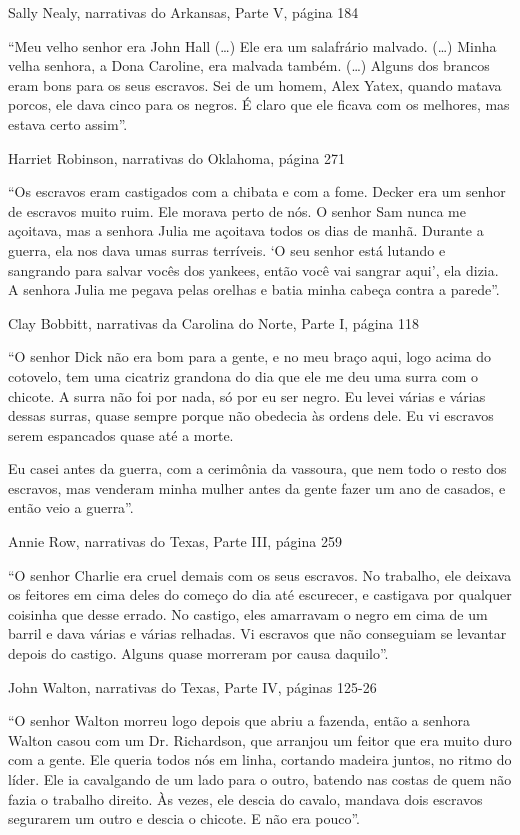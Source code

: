 Sally Nealy, narrativas do Arkansas, Parte V, página 184

``Meu velho senhor era John Hall (\ldots{}) Ele era um salafrário
malvado. (\ldots{}) Minha velha senhora, a Dona Caroline, era malvada
também. (\ldots{}) Alguns dos brancos eram bons para os seus escravos.
Sei de um homem, Alex Yatex, quando matava porcos, ele dava cinco para
os negros. É claro que ele ficava com os melhores, mas estava certo
assim''.

Harriet Robinson, narrativas do Oklahoma, página 271

``Os escravos eram castigados com a chibata e com a fome. Decker era um
senhor de escravos muito ruim. Ele morava perto de nós. O senhor Sam
nunca me açoitava, mas a senhora Julia me açoitava todos os dias de
manhã. Durante a guerra, ela nos dava umas surras terríveis. `O seu
senhor está lutando e sangrando para salvar vocês dos yankees, então
você vai sangrar aqui', ela dizia. A senhora Julia me pegava pelas
orelhas e batia minha cabeça contra a parede''.

Clay Bobbitt, narrativas da Carolina do Norte, Parte I, página 118

``O senhor Dick não era bom para a gente, e no meu braço aqui, logo
acima do cotovelo, tem uma cicatriz grandona do dia que ele me deu uma
surra com o chicote. A surra não foi por nada, só por eu ser negro. Eu
levei várias e várias dessas surras, quase sempre porque não obedecia às
ordens dele. Eu vi escravos serem espancados quase até a morte.

Eu casei antes da guerra, com a cerimônia da vassoura, que nem todo o
resto dos escravos, mas venderam minha mulher antes da gente fazer um
ano de casados, e então veio a guerra''.

Annie Row, narrativas do Texas, Parte III, página 259

``O senhor Charlie era cruel demais com os seus escravos. No trabalho,
ele deixava os feitores em cima deles do começo do dia até escurecer, e
castigava por qualquer coisinha que desse errado. No castigo, eles
amarravam o negro em cima de um barril e dava várias e várias relhadas.
Vi escravos que não conseguiam se levantar depois do castigo. Alguns
quase morreram por causa daquilo''.

John Walton, narrativas do Texas, Parte IV, páginas 125-26

``O senhor Walton morreu logo depois que abriu a fazenda, então a
senhora Walton casou com um Dr. Richardson, que arranjou um feitor que
era muito duro com a gente. Ele queria todos nós em linha, cortando
madeira juntos, no ritmo do líder. Ele ia cavalgando de um lado para o
outro, batendo nas costas de quem não fazia o trabalho direito. Às
vezes, ele descia do cavalo, mandava dois escravos segurarem um outro e
descia o chicote. E não era pouco''.

